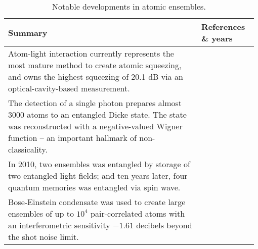 \begin{table*}[!htbp]
	\begin{tabular}{|p{0.755\linewidth}|p{0.22\linewidth}|}
		\hline
	\textbf{Summary} & \textbf{References \& years} \\	\hline \hline
		Atom-light interaction currently represents the most mature method to create atomic squeezing, and owns the highest squeezing of 20.1 dB via an optical-cavity-based measurement. & \cite{bib:hosten2016measurement} \\
		\hline
		The detection of a single photon prepares almost 3000 atoms to an entangled Dicke state. The state was reconstructed with a negative-valued Wigner function -- an important hallmark of non-classicality. &  \cite{bib:mcconnell2015entanglement} \\
		\hline
		In 2010, two ensembles was entangled by storage of two entangled light fields; and ten years later, four quantum memories was entangled via spin wave. & \cite{bib:lukin2000entanglement, bib:choi2010entanglement} \\
		\hline
		Bose-Einstein condensate was used to create large ensembles of up to ${10^4}$ pair-correlated atoms with an interferometric sensitivity $-1.61$ decibels beyond the shot noise limit. & \cite{bib:lucke2011twin} \\
		\hline
	\end{tabular}
	\captionspacetab \caption{Notable developments in atomic ensembles.} \label{tab:atomic_ensembles}
\end{table*}

